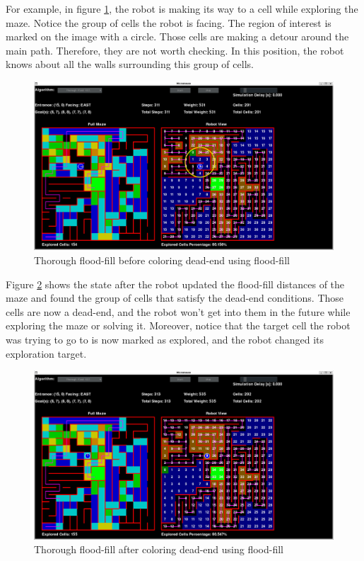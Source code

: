 \documentclass[12pt]{article}
\begin{document}
For example, in figure \ref{Before dead-end detection using flood-fill}, the robot is making its way to a \gls{cell} while exploring the \gls{maze}.
Notice the group of \gls{cell}s the robot is facing.
The region of interest is marked on the image with a circle.
Those \gls{cell}s are making a detour around the main path. Therefore, they are not worth checking.
In this position, the robot knows about all the walls surrounding this group of \gls{cell}s.

\begin{figure}[H]
\centering
\includegraphics[width=\textwidth]{images/thorough_ff_de_before_c.png}
\caption{Thorough flood-fill before coloring dead-end using flood-fill}
\label{Before dead-end detection using flood-fill}
\end{figure}

Figure \ref{After dead-end detection using flood-fill} shows the state after the robot updated the flood-fill distances of the \gls{maze} and found the group of \gls{cell}s that satisfy the dead-end conditions.
Those \gls{cell}s are now a dead-end, and the robot won't get into them in the future while exploring the \gls{maze} or solving it.
Moreover, notice that the target \gls{cell} the robot was trying to go to is now marked as explored, and the robot changed its exploration target.

\begin{figure}[H]
\centering
\includegraphics[width=\textwidth]{images/thorough_ff_de_after.png}
\caption{Thorough flood-fill after coloring dead-end using flood-fill}
\label{After dead-end detection using flood-fill}
\end{figure}
\end{document}
